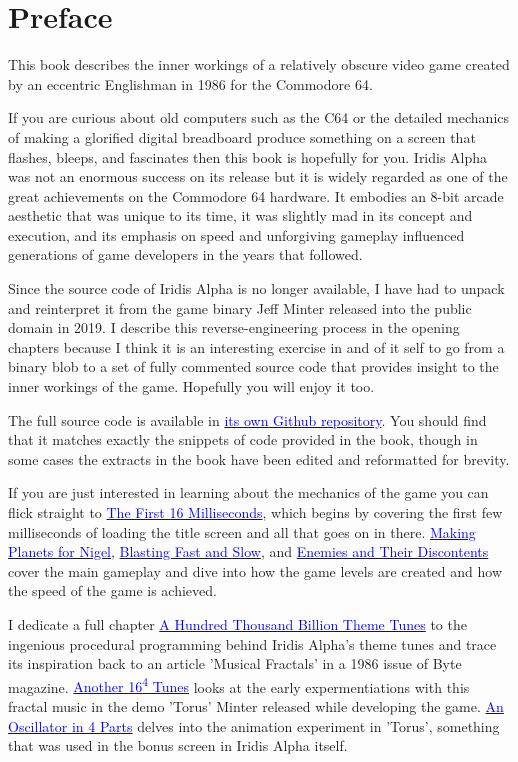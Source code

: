 \chapter{Preface} 
This book describes the inner workings of a relatively obscure video game created
by an eccentric Englishman in 1986 for the Commodore 64.

If you are curious about old computers such as the C64 or the detailed mechanics
of making a glorified digital breadboard produce something on a screen that flashes, bleeps,
and fascinates then this book is hopefully for you. Iridis Alpha was not an enormous success on its release
but it is widely regarded as one of the great achievements on the Commodore 64 hardware. It embodies an 8-bit arcade aesthetic that was
unique to its time, it was slightly mad in its concept and execution, and its emphasis on speed and unforgiving gameplay influenced
generations of game developers in the years that followed.

Since the source code of Iridis Alpha is no longer available, I have had to unpack and reinterpret it
from the game binary Jeff Minter released into the public domain in 2019. I describe this
reverse-engineering process in the opening chapters because I think it is an interesting exercise in and of it self to go from
a binary blob to a set of fully commented source code that provides insight to the inner workings of the game. Hopefully
you will enjoy it too.

The full source code is available in \href{https://github.com/mwenge/iridisalpha}{\textcolor{blue}{its own Github repository}}. 
You should find that it matches exactly the snippets of code provided in the book, though in some cases the extracts in the book have been edited
and reformatted for brevity.

If you are just interested in learning about the mechanics of the game you can flick straight to \hyperref[sec:first16]{\textcolor{blue}{The First 16 Milliseconds}}, 
which begins by covering the first few milliseconds of loading the title screen and all that goes on in there. \hyperref[sec:planets]{\textcolor{blue}{Making Planets for Nigel}},
\hyperref[sec:blast]{\textcolor{blue}{Blasting Fast and Slow}}, and \hyperref[sec:level]{\textcolor{blue}{Enemies and Their Discontents}} cover the main gameplay
and dive into how the game levels are created and how the speed of the game is achieved. 

I dedicate a full chapter \hyperref[sec:first16]{\textcolor{blue}{A Hundred Thousand Billion Theme Tunes}} to the ingenious procedural programming behind Iridis Alpha's theme
tunes and trace its inspiration back to an article 'Musical Fractals' in a 1986 issue of Byte magazine. \hyperref[sec:torusmusic]{\textcolor{blue}{Another 16\textsuperscript{4} Tunes}} looks
at the early expermentiations with this fractal music in the demo 'Torus' Minter released while developing the game. \hyperref[sec:torus]{\textcolor{blue}{An Oscillator in 4 Parts}} delves
into the animation experiment in 'Torus', something that was used in the bonus screen in Iridis Alpha itself.

